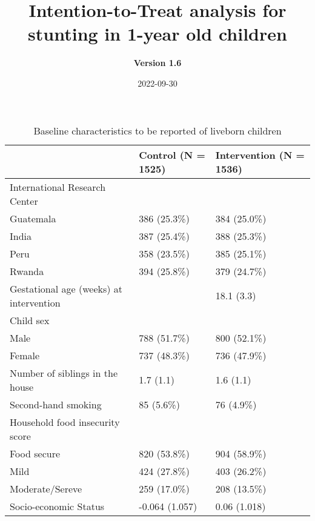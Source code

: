 \documentclass[
]{article}
\title{\textbf{Intention-to-Treat analysis for stunting in 1-year old
children}}
\subtitle{\textbf{Version 1.6}}
\author{}
\date{\vspace{-2.5em}2022-09-30}
\begin{document}
\maketitle

{
\setcounter{tocdepth}{2}
\tableofcontents
}
\begin{table}[H]

\caption{\label{tab:unnamed-chunk-3}Baseline characteristics to be reported of liveborn children}
\centering
\begin{tabular}[t]{l|l|l}
\hline
  & Control (N = 1525) & Intervention (N = 1536)\\
\hline
International Research Center &  & \\
\hline
\hspace{1em}Guatemala & 386 (25.3\%) & 384 (25.0\%)\\
\hline
\hspace{1em}India & 387 (25.4\%) & 388 (25.3\%)\\
\hline
\hspace{1em}Peru & 358 (23.5\%) & 385 (25.1\%)\\
\hline
\hspace{1em}Rwanda & 394 (25.8\%) & 379 (24.7\%)\\
\hline
Gestational age (weeks) at intervention &  & 18.1 (3.3)\\
\hline
Child sex &  & \\
\hline
\hspace{1em}Male & 788 (51.7\%) & 800 (52.1\%)\\
\hline
\hspace{1em}Female & 737 (48.3\%) & 736 (47.9\%)\\
\hline
Number of siblings in the house & 1.7 (1.1) & 1.6 (1.1)\\
\hline
Second-hand smoking & 85  (5.6\%) & 76  (4.9\%)\\
\hline
Household food insecurity score &  & \\
\hline
\hspace{1em}Food secure & 820 (53.8\%) & 904 (58.9\%)\\
\hline
\hspace{1em}Mild & 424 (27.8\%) & 403 (26.2\%)\\
\hline
\hspace{1em}Moderate/Sereve & 259 (17.0\%) & 208 (13.5\%)\\
\hline
Socio-economic Status & -0.064 (1.057) & 0.06 (1.018)\\
\hline
\end{tabular}
\end{table}
\end{document}

